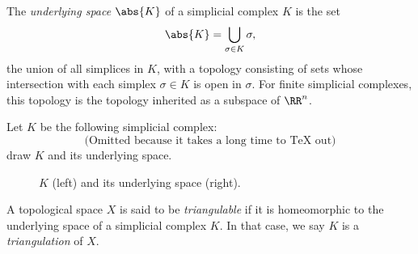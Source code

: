 \begin{definition}
  The \emph{underlying space} $\abs{K}$ of a simplicial complex $K$ is the set
  \[
    \abs{K} = \bigcup_{\sigma \in K} \sigma,
  \]
  the union of all simplices in $K$, with a topology consisting of sets whose
  intersection with each simplex $\sigma \in K$ is open in $\sigma$. For finite
  simplicial complexes, this topology is the topology inherited as a subspace of
  $\RR^n$.
\end{definition}
\begin{problem}[15.14]
  Let $K$ be the following simplicial complex:
  \[
    \text{(Omitted because it takes a long time to TeX out)}
  \]
  draw $K$ and its underlying space.
\end{problem}
\begin{solution}
  \begin{figure}[H]
    \centering
    \begin{minipage}{.49\linewidth}
      \centering
    \end{minipage}
    \begin{minipage}{.49\linewidth}
      \centering
    \end{minipage}
    \caption{$K$ (left) and its underlying space (right).}
  \end{figure}
\end{solution}
\begin{definition}
  A topological space $X$ is said to be \emph{triangulable} if it is
  homeomorphic to the underlying space of a simplicial complex $K$. In that
  case, we say $K$ is a \emph{triangulation} of $X$.
\end{definition}
